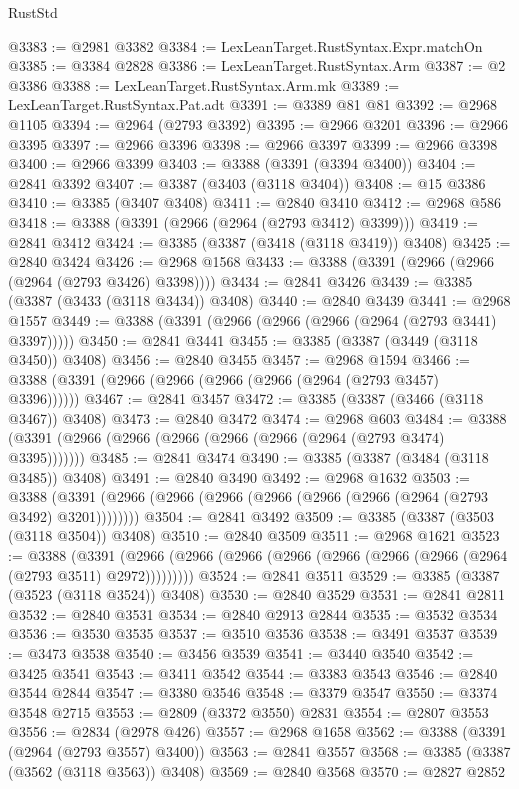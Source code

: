 \begin{lexlean}{RustStd}
\begin{coremodule}
@3383 := @2981 @3382
@3384 := LexLeanTarget.RustSyntax.Expr.matchOn
@3385 := @3384 @2828
@3386 := LexLeanTarget.RustSyntax.Arm
@3387 := @2 @3386
@3388 := LexLeanTarget.RustSyntax.Arm.mk
@3389 := LexLeanTarget.RustSyntax.Pat.adt
@3391 := @3389 @81 @81
@3392 := @2968 @1105
@3394 := @2964 (@2793 @3392)
@3395 := @2966 @3201
@3396 := @2966 @3395
@3397 := @2966 @3396
@3398 := @2966 @3397
@3399 := @2966 @3398
@3400 := @2966 @3399
@3403 := @3388 (@3391 (@3394 @3400))
@3404 := @2841 @3392
@3407 := @3387 (@3403 (@3118 @3404))
@3408 := @15 @3386
@3410 := @3385 (@3407 @3408)
@3411 := @2840 @3410
@3412 := @2968 @586
@3418 := @3388 (@3391 (@2966 (@2964 (@2793 @3412) @3399)))
@3419 := @2841 @3412
@3424 := @3385 (@3387 (@3418 (@3118 @3419)) @3408)
@3425 := @2840 @3424
@3426 := @2968 @1568
@3433 := @3388 (@3391 (@2966 (@2966 (@2964 (@2793 @3426) @3398))))
@3434 := @2841 @3426
@3439 := @3385 (@3387 (@3433 (@3118 @3434)) @3408)
@3440 := @2840 @3439
@3441 := @2968 @1557
@3449 := @3388 (@3391 (@2966 (@2966 (@2966 (@2964 (@2793 @3441) @3397)))))
@3450 := @2841 @3441
@3455 := @3385 (@3387 (@3449 (@3118 @3450)) @3408)
@3456 := @2840 @3455
@3457 := @2968 @1594
@3466 := @3388 (@3391 (@2966 (@2966 (@2966 (@2966 (@2964 (@2793 @3457) @3396))))))
@3467 := @2841 @3457
@3472 := @3385 (@3387 (@3466 (@3118 @3467)) @3408)
@3473 := @2840 @3472
@3474 := @2968 @603
@3484 := @3388 (@3391 (@2966 (@2966 (@2966 (@2966 (@2966 (@2964 (@2793 @3474) @3395)))))))
@3485 := @2841 @3474
@3490 := @3385 (@3387 (@3484 (@3118 @3485)) @3408)
@3491 := @2840 @3490
@3492 := @2968 @1632
@3503 := @3388 (@3391 (@2966 (@2966 (@2966 (@2966 (@2966 (@2966 (@2964 (@2793 @3492) @3201))))))))
@3504 := @2841 @3492
@3509 := @3385 (@3387 (@3503 (@3118 @3504)) @3408)
@3510 := @2840 @3509
@3511 := @2968 @1621
@3523 := @3388
    (@3391 (@2966 (@2966 (@2966 (@2966 (@2966 (@2966 (@2966 (@2964 (@2793 @3511) @2972)))))))))
@3524 := @2841 @3511
@3529 := @3385 (@3387 (@3523 (@3118 @3524)) @3408)
@3530 := @2840 @3529
@3531 := @2841 @2811
@3532 := @2840 @3531
@3534 := @2840 @2913 @2844
@3535 := @3532 @3534
@3536 := @3530 @3535
@3537 := @3510 @3536
@3538 := @3491 @3537
@3539 := @3473 @3538
@3540 := @3456 @3539
@3541 := @3440 @3540
@3542 := @3425 @3541
@3543 := @3411 @3542
@3544 := @3383 @3543
@3546 := @2840 @3544 @2844
@3547 := @3380 @3546
@3548 := @3379 @3547
@3550 := @3374 @3548 @2715
@3553 := @2809 (@3372 @3550) @2831
@3554 := @2807 @3553
@3556 := @2834 (@2978 @426)
@3557 := @2968 @1658
@3562 := @3388 (@3391 (@2964 (@2793 @3557) @3400))
@3563 := @2841 @3557
@3568 := @3385 (@3387 (@3562 (@3118 @3563)) @3408)
@3569 := @2840 @3568
@3570 := @2827 @2852

\end{coremodule}
\end{lexlean}
